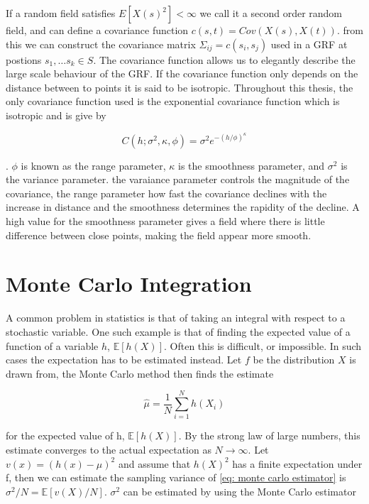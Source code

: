 If a random field satisfies $E[X(s)^2]< \infty$ we call it a second order random field, and can define a covariance function $c(s,t) = Cov(X(s), X(t))$. from this we can construct the covariance matrix $\Sigma_{ij} = c(s_i,s_j)$ used in a GRF at postions $s_1, \dots s_k \in S$. The covariance function allows us to elegantly describe the large scale behaviour of the GRF. If the covariance function only depends on the distance between to points it is said to be isotropic. Throughout this thesis, the only covariance function used is the exponential covariance function which is isotropic and is give by

$$
    C(h;\sigma^2, \kappa, \phi) = \sigma^2 e^{-(h/\phi)^\kappa}
$$

\cite{gaetan_spatial_2010}. $\phi$ is known as the range parameter, $\kappa$ is the smoothness parameter, and $\sigma^2$ is the variance parameter. the varaiance parameter controls the magnitude of the covariance, the range parameter how fast the covariance declines with the increase in distance and the smoothness determines the rapidity of the decline. A high value for the smoothness parameter gives a field where there is little difference between close points, making the field appear more smooth.



\section{Monte Carlo Integration}
A common problem in statistics is that of taking an integral with respect to a stochastic variable. One such example is that of finding the expected value of a function of a variable $h$, $\mathbb{E}[h(X)]$. Often this is difficult, or impossible. In such cases the expectation has to be estimated instead. Let $f$ be the distribution $X$ is drawn from, the Monte Carlo method then finds the estimate 

\begin{equation}
\hat{\mu} = \frac{1}{N} \sum_{i=1}^N h(X_i)
\label{eq: monte carlo estimator}    
\end{equation}
  
for the expected value of h, $\mathbb{E}[h(X)]$. By the strong law of large numbers, this estimate converges to the actual expectation as $N\rightarrow\infty$. Let $v(x) = (h(x) - {\mu})^2$ and assume that $h(X)^2$ has a finite expectation under f, then we can estimate the sampling variance of \ref{eq: monte carlo estimator} is $\sigma^2/N = \mathbb{E}[v(X)/N]$. $\sigma^2$ can be estimated by using the Monte Carlo estimator

